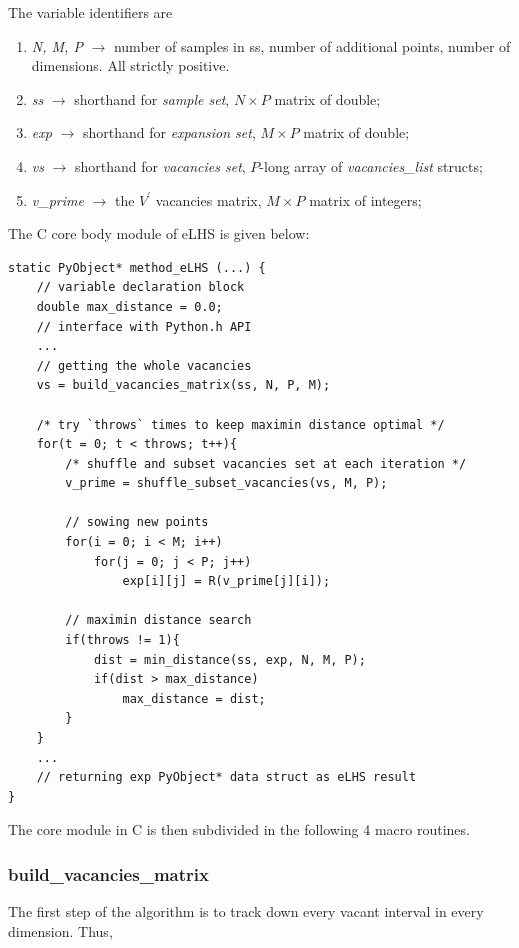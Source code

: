 \documentclass[12pt]{extarticle}
\begin{document}
The variable identifiers are
\begin{enumerate}
\item[] \emph{N, M, P} $\rightarrow$ number of samples in ss, number of additional points, number of dimensions. All strictly positive.

\item[] \emph{ss} $\rightarrow$ shorthand for \textit{sample set}, $N \times P$ matrix of double;

\item[] \emph{exp} $\rightarrow$ shorthand for \textit{expansion set}, $M \times P$ matrix of double;

\item[] \emph{vs} $\rightarrow$ shorthand for \textit{vacancies set}, $P$-long array of \textit{vacancies{\_}list} structs;

\item[] \emph{v{\_}prime} $\rightarrow$ the $V^\prime$ vacancies matrix, $M \times P$ matrix of integers;
\end{enumerate}

The C core body module of eLHS is given below:
\begin{lstlisting}[style=CStyle]
static PyObject* method_eLHS (...) {
	// variable declaration block
    double max_distance = 0.0;
	// interface with Python.h API
	...
	// getting the whole vacancies 
    vs = build_vacancies_matrix(ss, N, P, M);

	/* try `throws` times to keep maximin distance optimal */
    for(t = 0; t < throws; t++){
        /* shuffle and subset vacancies set at each iteration */
        v_prime = shuffle_subset_vacancies(vs, M, P);
        
        // sowing new points
        for(i = 0; i < M; i++)
            for(j = 0; j < P; j++)
                exp[i][j] = R(v_prime[j][i]);
        
	    // maximin distance search 
        if(throws != 1){
            dist = min_distance(ss, exp, N, M, P);
            if(dist > max_distance)
                max_distance = dist;
        }
    }
    ...
	// returning exp PyObject* data struct as eLHS result
}
\end{lstlisting}


The core module in C is then subdivided in the following 4 macro routines. 

\subsubsection{build{\_}vacancies{\_}matrix}
The first step of the algorithm is to track down every vacant interval in every dimension. Thus, 
\end{document}
